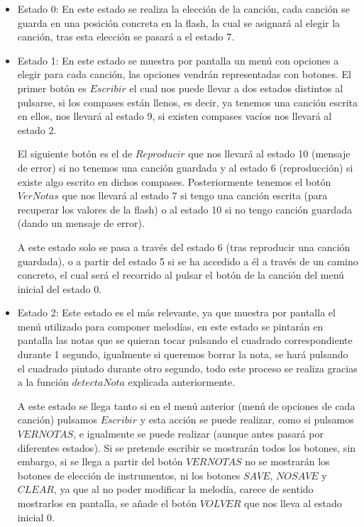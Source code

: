 \documentclass[12pt,a4paper]{article}
\begin{document}
\begin{itemize}
\item Estado 0: En este estado se realiza la elección de la canción, cada canción se guarda en una posición concreta en la flash, la cual se asignará al elegir la canción, tras esta elección se pasará a el estado 7.

\item Estado 1: En este estado se muestra por pantalla un menú con opciones a elegir para cada canción, las opciones vendrán representadas con botones. El primer botón es $Escribir$ el cual nos puede llevar a dos estados distintos al pulsarse, si los compases están llenos, es decir, ya tenemos una canción escrita en ellos, nos llevará al estado 9, si existen compases vacíos nos llevará al estado 2.

El siguiente botón es el de $Reproducir$ que nos llevará al estado 10 (mensaje de error) si no tenemos una canción guardada y al estado 6 (reproducción) si existe algo escrito en dichos compases. Posteriormente tenemos el botón $Ver Notas$ que nos llevará al estado 7 si tengo una canción escrita (para recuperar los valores de la flash) o al estado 10 si no tengo canción guardada (dando un mensaje de error).

A este estado solo se pasa a través del estado 6 (tras reproducir una canción guardada), o a partir del estado 5 si se ha accedido a él a través de un camino concreto, el cual será el recorrido al pulsar el botón de la canción del menú inicial del estado 0.

\item Estado 2: Este estado es el más relevante, ya que muestra por pantalla el menú utilizado para componer melodías, en este estado se pintarán en pantalla las notas que se quieran tocar pulsando el cuadrado correspondiente durante 1 segundo, igualmente si queremos borrar la nota, se hará pulsando el cuadrado pintado durante otro segundo, todo este proceso se realiza gracias a la función $detectaNota$ explicada anteriormente. 

A este estado se llega tanto si en el menú anterior (menú de opciones de cada canción) pulsamos $Escribir$ y esta acción se puede realizar, como si pulsamos $VERNOTAS$, e igualmente se puede realizar (aunque antes pasará por diferentes estados). Si se pretende escribir se mostrarán todos los botones, sin embargo, si se llega a partir del botón $VERNOTAS$ no se mostrarán los botones de elección de instrumentos, ni los botones $SAVE$, $NOSAVE$ y $CLEAR$, ya que al no poder modificar la melodía, carece de sentido mostrarlos en pantalla, se añade el botón $VOLVER$ que nos lleva al estado inicial 0.


\end{itemize}
\end{document}
